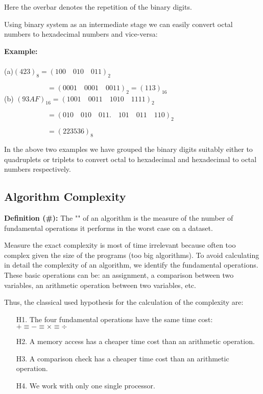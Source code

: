 	Here the overbar denotes the repetition of the binary digits.
	
	Using binary system as an intermediate stage we can easily convert octal numbers to hexadecimal numbers and vice-versa:
	\begin{tcolorbox}[colframe=black,colback=white,sharp corners]
	\textbf{{\Large {}}Example:}\\\\
	(a)$(423)_{8}=(100\quad 010\quad 011)_{2}$
	
	$\qquad\qquad\qquad=(0001\quad 0001\quad 0011)_{2}=(113)_{16}$\\
	
	(b) $(93AF)_{16}=(1001\quad0011\quad1010\quad1111)_{2}$
	
	$\qquad\qquad\qquad=(010\quad010\quad011.\quad101\quad011\quad110)_{2}$
	
	$\qquad\qquad\qquad=(223536)_{8}$
	\end{tcolorbox}
	
	In the above two examples we have grouped the binary digits suitably either to quadruplets or triplets to convert octal to hexadecimal and hexadecimal to octal numbers respectively.



	\pagebreak	
	\subsection{Algorithm Complexity}\label{algorithm complexity}

\textbf{Definition (\#\mydef):} The "" of an algorithm is the measure of the number of fundamental operations it performs in the worst case on a dataset.

Measure the exact complexity is most of time irrelevant because often too complex given the size of the programs (too big algorithms). To avoid calculating in detail the complexity of an algorithm, we identify the fundamental operations. These basic operations can be: an assignment, a comparison between two variables, an arithmetic operation between two variables, etc.

Thus, the classical used hypothesis for the calculation of the complexity are:

	\begin{enumerate}
		\item[H1.] The four fundamental operations have the same time cost: $+ \equiv - \equiv \times \equiv \div$
		\item[H2.] A memory access has a cheaper time cost than an arithmetic operation.
		\item[H3.] A comparison check has a cheaper time cost than an arithmetic operation.
		\item[H4.] We work with only one single processor.
	\end{enumerate}
	
